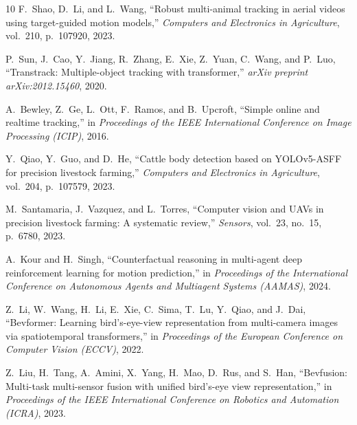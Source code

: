 \documentclass[10pt,conference,letterpaper,twocolumn]{article}
\begin{document}
\begin{thebibliography}{10}
F.~Shao, D.~Li, and L.~Wang, ``Robust multi-animal tracking in aerial videos using target-guided motion models,'' {\em Computers and Electronics in Agriculture}, vol.~210, p.~107920, 2023.

P.~Sun, J.~Cao, Y.~Jiang, R.~Zhang, E.~Xie, Z.~Yuan, C.~Wang, and P.~Luo, ``Transtrack: Multiple-object tracking with transformer,'' {\em arXiv preprint arXiv:2012.15460}, 2020.

A.~Bewley, Z.~Ge, L.~Ott, F.~Ramos, and B.~Upcroft, ``Simple online and realtime tracking,'' in {\em Proceedings of the IEEE International Conference on Image Processing (ICIP)}, 2016.

Y.~Qiao, Y.~Guo, and D.~He, ``Cattle body detection based on YOLOv5-ASFF for precision livestock farming,'' {\em Computers and Electronics in Agriculture}, vol.~204, p.~107579, 2023.

M.~Santamaria, J.~Vazquez, and L.~Torres, ``Computer vision and UAVs in precision livestock farming: A systematic review,'' {\em Sensors}, vol.~23, no.~15, p.~6780, 2023.

A.~Kour and H.~Singh, ``Counterfactual reasoning in multi-agent deep reinforcement learning for motion prediction,'' in {\em Proceedings of the International Conference on Autonomous Agents and Multiagent Systems (AAMAS)}, 2024.

Z.~Li, W.~Wang, H.~Li, E.~Xie, C.~Sima, T.~Lu, Y.~Qiao, and J.~Dai, ``Bevformer: Learning bird's-eye-view representation from multi-camera images via spatiotemporal transformers,'' in {\em Proceedings of the European Conference on Computer Vision (ECCV)}, 2022.

Z.~Liu, H.~Tang, A.~Amini, X.~Yang, H.~Mao, D.~Rus, and S.~Han, ``Bevfusion: Multi-task multi-sensor fusion with unified bird's-eye view representation,'' in {\em Proceedings of the IEEE International Conference on Robotics and Automation (ICRA)}, 2023.

\end{thebibliography}
\end{document}
